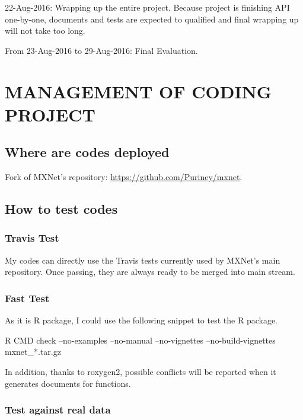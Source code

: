 \documentclass[]{article}
\newenvironment{Shaded}{\begin{snugshade}}{\end{snugshade}}
\newcommand{\NormalTok}[1]{{#1}}
\begin{document}
22-Aug-2016: Wrapping up the entire project. Because project is
finishing API one-by-one, documents and tests are expected to qualified
and final wrapping up will not take too long.

From 23-Aug-2016 to 29-Aug-2016: Final Evaluation.

\section{MANAGEMENT OF CODING
PROJECT}\label{management-of-coding-project}

\subsection{Where are codes deployed}\label{where-are-codes-deployed}

Fork of MXNet's repository: \url{https://github.com/Puriney/mxnet}.

\subsection{How to test codes}\label{how-to-test-codes}

\subsubsection{Travis Test}\label{travis-test}

My codes can directly use the Travis tests currently used by MXNet's
main repository. Once passing, they are always ready to be merged into
main stream.

\subsubsection{Fast Test}\label{fast-test}

As it is R package, I could use the following snippet to test the R
package.

\begin{Shaded}
\begin{Highlighting}[]
\NormalTok{R CMD check --no-examples --no-manual --no-vignettes --no-build-vignettes mxnet_*.tar.gz}
\end{Highlighting}
\end{Shaded}

In addition, thanks to roxygen2, possible conflicts will be reported
when it generates documents for functions.

\subsubsection{Test against real data}\label{test-against-real-data}
\end{document}
